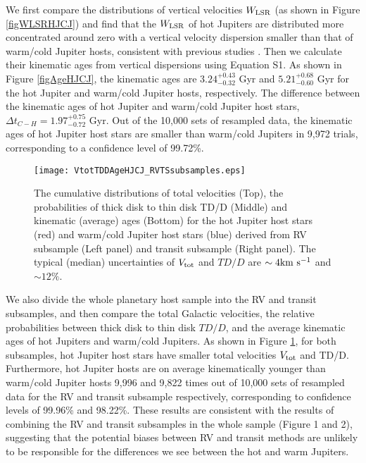 \documentclass[twocolumn]{pnas-new}
\begin{document}
We first compare the distributions of vertical velocities $W_{\rm LSR}$ (as shown in Figure \ref{figWLSRHJCJ}) and
find that the $W_{\rm LSR}$ of hot Jupiters are distributed more concentrated around zero with a vertical velocity dispersion smaller than that of warm/cold Jupiter hosts, consistent with previous studies \citep{2019AJ....158..190H}.
Then we calculate their kinematic ages from vertical dispersions using Equation S1.
As shown in Figure \ref{figAgeHJCJ}, the kinematic ages are $3.24^{+0.43}_{-0.32}$ Gyr and $5.21^{+0.68}_{-0.60}$ Gyr for the hot Jupiter and warm/cold Jupiter hosts, respectively.
The difference between the kinematic ages of hot Jupiter and warm/cold Jupiter host stars, $\Delta t_{C-H} = 1.97^{+0.75}_{-0.72}$ Gyr. 
Out of the 10,000 sets of resampled data, the kinematic ages of hot Jupiter host stars are smaller than warm/cold Jupiters in 9,972 trials, corresponding to a confidence level of 99.72\%.

\begin{figure}[!t]
\centering
\texttt{[image: VtotTDDAgeHJCJ\_RVTSsubsamples.eps]}
\caption{The cumulative distributions of total velocities (Top), the probabilities of thick disk to thin disk TD/D (Middle) and kinematic (average) ages (Bottom) for the hot Jupiter host stars (red) and warm/cold Jupiter host stars (blue) derived from RV subsample (Left panel) and transit subsample (Right panel).
The typical (median) uncertainties of $V_{\rm tot}$ and $TD/D$ are $\sim 4 \rm km \ s^{-1}$ and $\sim 12\%$.
\label{figVtotTDDAgeHJCJ_RVTS}}
\end{figure}

{We also divide the whole planetary host sample into the RV and transit subsamples, and then compare the total Galactic velocities, the relative probabilities between thick disk to thin disk $TD/D$, and the average kinematic ages of hot Jupiters and warm/cold Jupiters.
As shown in Figure \ref{figVtotTDDAgeHJCJ_RVTS}, for both subsamples, hot Jupiter host stars have smaller total velocities $V_{\rm tot}$ and TD/D.
Furthermore, hot Jupiter hosts are on average kinematically younger than warm/cold Jupiter hosts 9,996 and 9,822 times out of 10,000 sets of resampled data for the RV and transit subsample respectively, corresponding to confidence levels of 99.96\% and 98.22\%.
These results are consistent with the results of combining the RV and transit subsamples in the whole sample (Figure 1 and 2), suggesting that the potential biases between RV and transit methods are unlikely to be responsible for the differences we see between the hot and warm Jupiters. }
\end{document}
